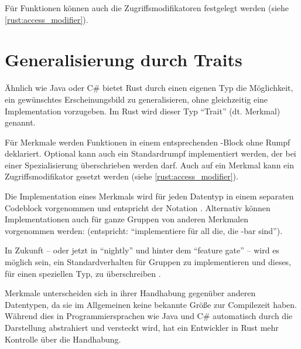 Für Funktionen können auch die Zugriffsmodifikatoren festgelegt werden (siehe \autoref{rust:access_modifier}).

\section{Generalisierung durch Traits}
\label{rust:traits}
\label{rust:generics}
\label{rust:trait:default}
\label{rust:trait:drop}

Ähnlich wie Java oder C\# bietet Rust durch einen eigenen Typ die Möglichkeit, ein gewünschtes Erscheinungsbild zu generalisieren, ohne gleichzeitig eine Implementation vorzugeben.
Im Rust wird dieser Typ \enquote{Trait} (dt. Merkmal) genannt.

Für Merkmale werden Funktionen in einem entsprechenden -Block ohne Rumpf deklariert.
Optional kann auch ein Standardrumpf implementiert werden, der bei einer Spezialisierung überschrieben werden darf.
Auch auf ein Merkmal kann ein Zugriffsmodifikator gesetzt werden (siehe \autoref{rust:access_modifier}).

Die Implementation eines Merkmals wird für jeden Datentyp in einem separaten Codeblock vorgenommen und entspricht der Notation .
Alternativ können Implementationen auch für ganze Gruppen von anderen Merkmalen vorgenommen werden:  (entspricht: \enquote{implementiere  für all die, die -bar sind}).

In Zukunft -- oder jetzt in \enquote{nightly} und hinter dem \enquote{feature gate}  -- wird es möglich sein, ein Standardverhalten für Gruppen zu implementieren und dieses, für einen speziellen Typ, zu überschreiben \cite{rust:github:specialization}.

Merkmale unterscheiden sich in ihrer Handhabung gegenüber anderen Datentypen, da sie im Allgemeinen keine bekannte Größe zur Compilezeit haben.
Während dies in Programmiersprachen wie Java und C\# automatisch durch die Darstellung abstrahiert und versteckt wird, hat ein Entwickler in Rust mehr Kontrolle über die Handhabung.

